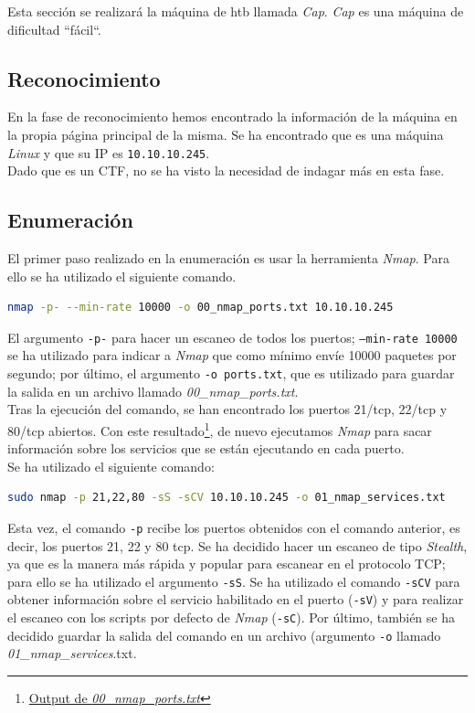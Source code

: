Esta sección se realizará la máquina de \acrlong{htb} llamada \textit{Cap}\cite{cap}. \textit{Cap} es una máquina de dificultad ``fácil``.

\subsection{Reconocimiento}
En la fase de reconocimiento hemos encontrado la información de la máquina en la propia página principal\cite{cap} de la misma. Se ha encontrado que es una máquina \textit{Linux} y que su IP es \texttt{10.10.10.245}.\\

Dado que es un \acrshort{CTF}, no se ha visto la necesidad de indagar más en esta fase.

\subsection{Enumeración}
El primer paso realizado en la enumeración es usar la herramienta \textit{Nmap}\cite{nmap}. Para ello se ha utilizado el siguiente comando.
\begin{lstlisting}[language=bash]
nmap -p- --min-rate 10000 -o 00_nmap_ports.txt 10.10.10.245
\end{lstlisting}
El argumento \texttt{-p-} para hacer un escaneo de todos los puertos; \texttt{--min-rate 10000} se ha utilizado para indicar a \textit{Nmap} que como mínimo envíe 10000 paquetes por segundo; por último, el argumento \texttt{-o ports.txt}, que es utilizado para guardar la salida en un archivo llamado \textit{00\_nmap\_ports.txt}.\\

Tras la ejecución del comando, se han encontrado los puertos 21/\acrshort{tcp}, 22/\acrshort{tcp} y 80/\acrshort{tcp} abiertos. Con este resultado\footnote{\href{https://github.com/VictorNS69/TFM/blob/main/machines/cap/00_nmap_ports.txt}{Output de \textit{00\_nmap\_ports.txt}}}, de nuevo ejecutamos \textit{Nmap} para sacar información sobre los servicios que se están ejecutando en cada puerto.\\

Se ha utilizado el siguiente comando:
\begin{lstlisting}[language=bash]
sudo nmap -p 21,22,80 -sS -sCV 10.10.10.245 -o 01_nmap_services.txt
\end{lstlisting}

Esta vez, el comando \texttt{-p} recibe los puertos obtenidos con el comando anterior, es decir, los puertos 21, 22 y 80 \acrshort{tcp}. Se ha decidido hacer un escaneo de tipo \textit{Stealth}, ya que es la manera más rápida y popular para escanear en el protocolo TCP; para ello se ha utilizado el argumento \texttt{-sS}. Se ha utilizado el comando \texttt{-sCV} para obtener información sobre el servicio habilitado en el puerto (\texttt{-sV}) y para realizar el escaneo con los scripts por defecto de \textit{Nmap} (\texttt{-sC}). Por último, también se ha decidido guardar la salida del comando en un archivo (argumento \texttt{-o} llamado \textit{01\_nmap\_services}.txt.\\

